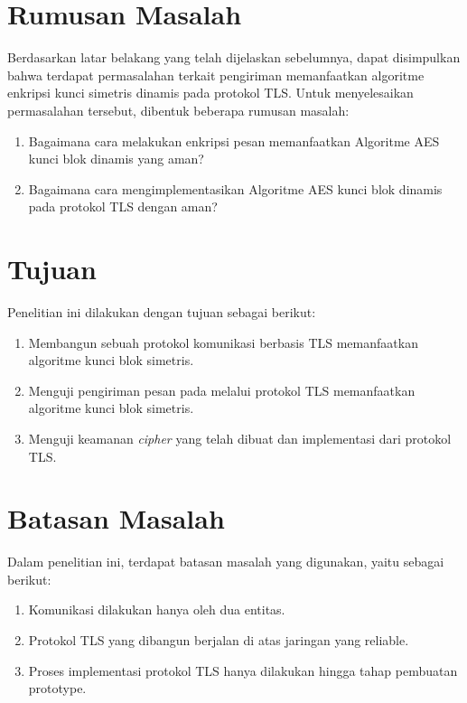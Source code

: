 \section{Rumusan Masalah}
Berdasarkan latar belakang yang telah dijelaskan sebelumnya, dapat disimpulkan bahwa terdapat permasalahan terkait pengiriman memanfaatkan algoritme enkripsi kunci simetris dinamis pada protokol TLS. Untuk menyelesaikan permasalahan tersebut, dibentuk beberapa rumusan masalah:
\begin{enumerate}
  \item Bagaimana cara melakukan enkripsi pesan memanfaatkan Algoritme AES kunci blok dinamis yang aman?
  \item Bagaimana cara mengimplementasikan Algoritme AES kunci blok dinamis pada protokol TLS dengan aman?
\end{enumerate}

\section{Tujuan}
Penelitian ini dilakukan dengan tujuan sebagai berikut:

\begin{enumerate}
  \item Membangun sebuah protokol komunikasi berbasis TLS memanfaatkan algoritme kunci blok simetris.
  \item Menguji pengiriman pesan pada melalui protokol TLS memanfaatkan algoritme kunci blok simetris.
  \item Menguji keamanan \emph{cipher} yang telah dibuat dan implementasi dari protokol TLS.
\end{enumerate}

\section{Batasan Masalah}
Dalam penelitian ini, terdapat batasan masalah yang digunakan, yaitu sebagai berikut:
\begin{enumerate}
  \item Komunikasi dilakukan hanya oleh dua entitas.
  \item Protokol TLS yang dibangun berjalan di atas jaringan yang reliable.
  \item Proses implementasi protokol TLS hanya dilakukan hingga tahap pembuatan prototype.
\end{enumerate}

